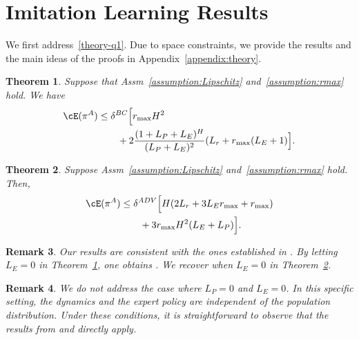 \documentclass{article}
\theoremstyle{plain}
\newtheorem{theorem}{Theorem}[section]
\newtheorem{remark}[theorem]{Remark}
\begin{document}
\section{Imitation Learning Results}
\label{sec:il-results}

We first address~\ref{theory-q1}. Due to space constraints, we provide the results and the main ideas of the proofs in Appendix~\ref{appendix:theory}.


\begin{theorem}
    \label{theorem:BC_LPge0}
    Suppose that Assm~\ref{assumption:Lipschitz} and~\ref{assumption:rmax} hold. We have
    \begin{equation*}
        \begin{split}
            \cE(\pi^A) &\leq \delta^{BC}\Big[r_{\max} H^2 
            \\
            &\qquad+ 2\frac{(1 + L_P + L_E)^H}{(L_P + L_E)^2} (L_r + r_{\max}(L_E + 1)\Big].
        \end{split}
    \end{equation*}
\end{theorem}

\begin{theorem}
    \label{theorem:ADV_LPge0}
    Suppose Assm~\ref{assumption:Lipschitz} and~\ref{assumption:rmax} hold. Then,
    \begin{equation}
        \begin{split}
            \cE(\pi^A) 
            &\leq \delta^{ADV}\Big[H(2L_r + 3L_E r_{\max} + r_{\max}) 
            \\
            &\qquad + 3r_{\max}H^2(L_E + L_P) \Big].
        \end{split}
    \end{equation}
\end{theorem}

\begin{remark}
    Our results are consistent with the ones established in \citep{ramponi2023imitation}. By letting $L_E = 0$ in Theorem~\ref{theorem:BC_LPge0}, one obtains \citep[Theorem~3]{ramponi2023imitation}. We recover \citep[Theorem~5]{ramponi2023imitation} when $L_E = 0$ in Theorem~\ref{theorem:ADV_LPge0}.
\end{remark}

\begin{remark}
    We do not address the case where $L_P = 0$ and $L_E = 0$. In this specific setting, the dynamics and the expert policy are independent of the population distribution. Under these conditions, it is straightforward to observe that the results from \citet[Theorem~1]{ramponi2023imitation} and \citet[Theorem~2]{ramponi2023imitation} directly apply.
\end{remark}
\end{document}
